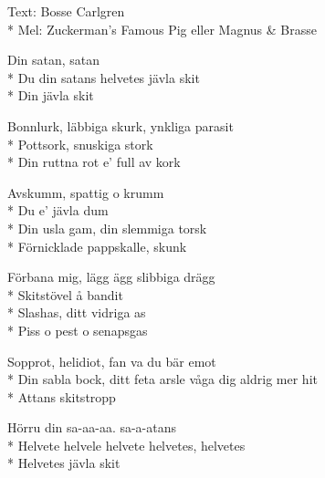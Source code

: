\begin{SongText}[Svordomsvisan]
    \begin{SongInfo}
        Text: Bosse Carlgren\\*%
        Mel: Zuckerman’s Famous Pig eller Magnus \& Brasse
    \end{SongInfo}
    \begin{SongVerse}
        Din satan, satan\\*%
        Du din satans helvetes jävla skit\\*%
        Din jävla skit
    \end{SongVerse}
    \begin{SongVerse}
        Bonnlurk, läbbiga skurk, ynkliga parasit\\*%
        Pottsork, snuskiga stork\\*%
        Din ruttna rot e’ full av kork
    \end{SongVerse}
    \begin{SongVerse}
        Avskumm, spattig o krumm\\*%
        Du e’ jävla dum\\*%
        Din usla gam, din slemmiga torsk\\*%
        Förnicklade pappskalle, skunk
    \end{SongVerse}
    \begin{SongVerse}
        Förbana mig, lägg ägg slibbiga drägg\\*%
        Skitstövel å bandit\\*%
        Slashas, ditt vidriga as\\*%
        Piss o pest o senapsgas
    \end{SongVerse}
    \begin{SongVerse}
        Sopprot, helidiot, fan va du bär emot\\*%
        Din sabla bock, ditt feta arsle våga dig aldrig mer hit\\*%
        Attans skitstropp
    \end{SongVerse}
    \begin{SongVerse}
        Hörru din sa-aa-aa. sa-a-atans\\*%
        Helvete helvele helvete helvetes, helvetes\\*%
        Helvetes jävla skit
    \end{SongVerse}
\end{SongText}
